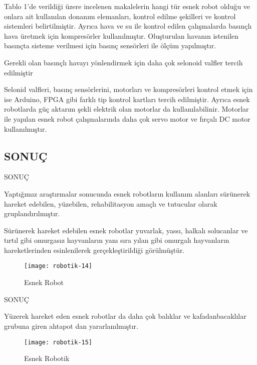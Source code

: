\documentclass{beamer}
\begin{document}
\begin{frame}
\begin{block}
 \item Tablo 1’de verildiği üzere incelenen makalelerin hangi tür esnek robot olduğu ve onlara ait kullanılan donanım elemanları, kontrol edilme şekilleri ve kontrol sistemleri belirtilmiştir. Ayrıca hava ve su ile kontrol edilen çalışmalarda basınçlı hava üretmek için kompresörler kullanılmıştır. Oluşturulan havanın istenilen basınçta sisteme verilmesi için basınç sensörleri ile ölçüm yapılmıştır. 
 
 \item Gerekli olan basınçlı havayı yönlendirmek için daha çok selonoid valfler tercih edilmiştir
 
 \item Selonid valfleri, basınç sensörlerini, motorları ve kompresörleri kontrol etmek için ise Arduino, FPGA gibi farklı tip kontrol kartları tercih edilmiştir. Ayrıca esnek robotlarda güç aktarım şekli elektrik olan motorlar da kullanılabilinir. Motorlar ile yapılan esnek robot çalışmalarında daha çok servo motor ve fırçalı DC motor kullanılmıştır.
\end{block}
\end{frame}

\subsection{SONUÇ }

\begin{frame}{SONUÇ}
\begin{block}
\item Yaptığımız araştırmalar sonucunda esnek robotların kullanım alanları sürünerek hareket edebilen, yüzebilen, rehabilitasyon amaçlı ve tutucular olarak gruplandırılmıştır. 

\item Sürünerek hareket edebilen esnek robotlar yuvarlak, yassı, halkalı solucanlar ve tırtıl gibi omurgasız hayvanların yanı sıra yılan gibi omurgalı hayvanların hareketlerinden esinlenilerek gerçekleştirildiği görülmüştür.
\end{block}
\begin{figure}
\texttt{[image: robotik-14]}
\caption{\label{Şekil-13} Esnek Robot}
\end{figure}
\end{frame}

\begin{frame}{SONUÇ}
\begin{block}
\item Yüzerek hareket eden esnek robotlar da daha çok balıklar ve kafadanbacaklılar grubuna giren ahtapot dan yararlanılmıştır.

\begin{figure}
\texttt{[image: robotik-15]}
\caption{\label{Şekil-14} Esnek Robotik}
\end{figure}
\end{block}
\end{frame}
\end{document}
